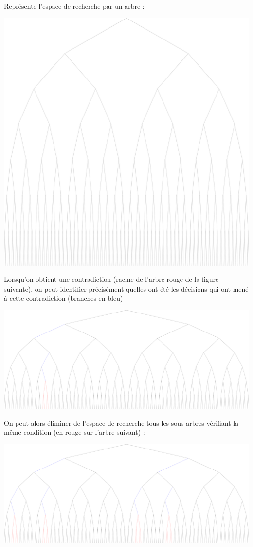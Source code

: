 Représente l'espace de recherche par un arbre :
\begin{center}
\includegraphics[width=0.8\linewidth]{reso/plain.pdf}
\end{center}

Lorsqu'on obtient une contradiction (racine de l'arbre rouge de la figure
suivante), on peut identifier précisément quelles ont été les décisions qui ont
mené à cette contradiction (branches en bleu) :
\begin{center}
\includegraphics[width=0.8\linewidth]{reso/error.pdf}
\end{center}

On peut alors éliminer de l'espace de recherche tous les sous-arbres vérifiant
la même condition (en rouge sur l'arbre suivant) :
\begin{center}
\includegraphics[width=0.8\linewidth]{reso/eliminated.pdf}
\end{center}

